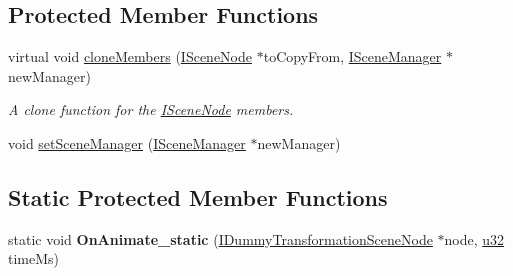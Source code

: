 \subsection*{Protected Member Functions}
\begin{DoxyCompactItemize}
\item 
virtual void \hyperlink{classirr_1_1scene_1_1ISceneNode_a366e4c223481f5af089c1f0ecce3394f}{clone\+Members} (\hyperlink{classirr_1_1scene_1_1ISceneNode}{I\+Scene\+Node} $\ast$to\+Copy\+From, \hyperlink{classirr_1_1scene_1_1ISceneManager}{I\+Scene\+Manager} $\ast$new\+Manager)
\begin{DoxyCompactList}\small\item\em A clone function for the \hyperlink{classirr_1_1scene_1_1ISceneNode}{I\+Scene\+Node} members. \end{DoxyCompactList}\item 
void \hyperlink{classirr_1_1scene_1_1ISceneNode_a513d09ae37f71391d7c4838e29164a3e}{set\+Scene\+Manager} (\hyperlink{classirr_1_1scene_1_1ISceneManager}{I\+Scene\+Manager} $\ast$new\+Manager)
\end{DoxyCompactItemize}
\subsection*{Static Protected Member Functions}
\begin{DoxyCompactItemize}
\item 
static void {\bfseries On\+Animate\+\_\+static} (\hyperlink{classirr_1_1scene_1_1IDummyTransformationSceneNode}{I\+Dummy\+Transformation\+Scene\+Node} $\ast$node, \hyperlink{namespaceirr_a0416a53257075833e7002efd0a18e804}{u32} time\+Ms)\hypertarget{classirr_1_1scene_1_1ISceneNode_a669f88c8a0e325786f8a8f7f929e41d9}{}\label{classirr_1_1scene_1_1ISceneNode_a669f88c8a0e325786f8a8f7f929e41d9}

\end{DoxyCompactItemize}
